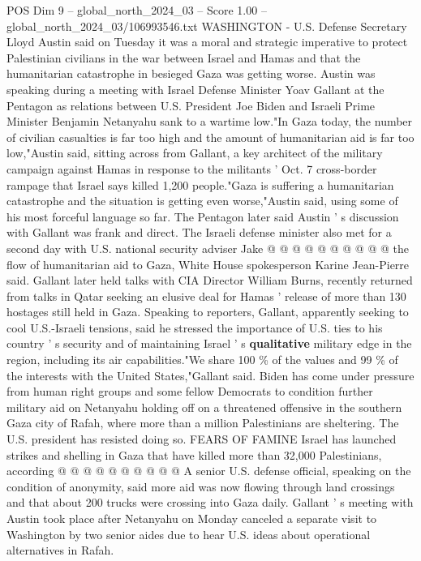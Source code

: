 \begin{textsample}{POS Dim 9 – global\_north\_2024\_03 – Score 1.00 – global\_north\_2024\_03/106993546.txt}  \label{ex:f9_pos_279}
WASHINGTON - U.S.
Defense Secretary Lloyd Austin said on Tuesday it was a moral and strategic imperative to protect Palestinian civilians in the war between Israel and Hamas and that the humanitarian catastrophe in besieged Gaza was getting worse.
Austin was speaking during a meeting with Israel Defense Minister Yoav Gallant at the Pentagon as relations between U.S.
President Joe Biden and Israeli Prime Minister Benjamin Netanyahu sank to a wartime low."In Gaza today, the number of civilian casualties is far too high and the amount of humanitarian aid is far too low,"Austin said, sitting across from Gallant, a key architect of the military campaign against Hamas in response to the militants ' Oct. 7 cross-border rampage that Israel says killed 1,200 people."Gaza is suffering a humanitarian catastrophe and the situation is getting even worse,"Austin said, using some of his most forceful language so far.
The Pentagon later said Austin ' s discussion with Gallant was frank and direct.
The Israeli defense minister also met for a second day with U.S. national security adviser Jake @ @ @ @ @ @ @ @ @ @ the flow of humanitarian aid to Gaza, White House spokesperson Karine Jean-Pierre said.
Gallant later held talks with CIA Director William Burns, recently returned from talks in Qatar seeking an elusive deal for Hamas ' release of more than 130 hostages still held in Gaza.
Speaking to reporters, Gallant, apparently seeking to cool U.S.-Israeli tensions, said he stressed the importance of U.S. ties to his country ' s security and of maintaining Israel ' s \textbf{qualitative} military edge in the region, including its air capabilities."We share 100 \% of the values and 99 \% of the interests with the United States,"Gallant said.
Biden has come under pressure from human right groups and some fellow Democrats to condition further military aid on Netanyahu holding off on a threatened offensive in the southern Gaza city of Rafah, where more than a million Palestinians are sheltering.
The U.S. president has resisted doing so.
FEARS OF FAMINE Israel has launched strikes and shelling in Gaza that have killed more than 32,000 Palestinians, according @ @ @ @ @ @ @ @ @ @ A senior U.S. defense official, speaking on the condition of anonymity, said more aid was now flowing through land crossings and that about 200 trucks were crossing into Gaza daily.
Gallant ' s meeting with Austin took place after Netanyahu on Monday canceled a separate visit to Washington by two senior aides due to hear U.S. ideas about operational alternatives in Rafah.

\end{textsample}
